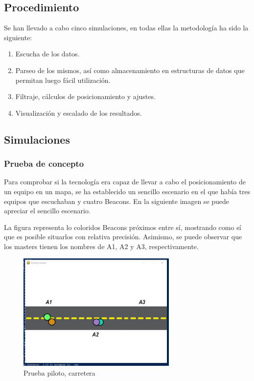 \documentclass[paper=a4, fontsize=11pt,twoside]{scrartcl}
\begin{document}
    \subsection{Procedimiento}
        Se han llevado a cabo cinco simulaciones, en todas ellas la metodología ha sido la siguiente:
        \begin{enumerate}
            \item Escucha de los datos.
            \item Parseo de los mismos, así como almacenamiento en estructuras de datos que permitan luego fácil utilización.
            \item Filtraje, cálculos de posicionamiento y ajustes.
            \item Visualización y escalado de los resultados.
        \end{enumerate}
    \subsection{Simulaciones}
        \subsubsection{Prueba de concepto}
            Para comprobar si la tecnología era capaz de llevar a cabo el posicionamiento de un equipo en un mapa, se ha establecido un sencillo
            escenario en el que había tres equipos que escuchaban y cuatro Beacons. En la siguiente imagen se puede apreciar el sencillo escenario.

            La figura representa lo coloridos Beacons próximos entre sí, mostrando como sí que es posible situarlos con relativa precisión.
            Asimismo, se puede observar que los masters tienen los nombres de A1, A2 y A3, respectivamente.
            \begin{center}
                \begin{figure}[]
                    \centering
                    \includegraphics[width=0.7\textwidth]{../../Memmory/images/road_1.PNG}
                    \caption{Prueba piloto, carretera}
                    \label{fig:mesh14}
                \end{figure}
            \end{center}
\end{document}
